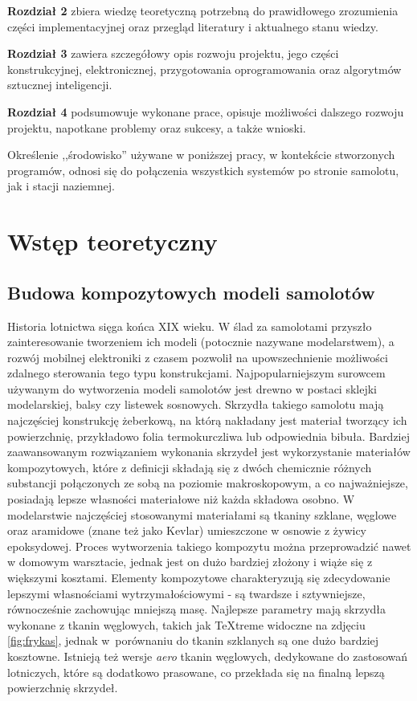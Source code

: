 \documentclass[12pt, a4paper]{article}
\begin{document}
\textbf{Rozdział 2} zbiera wiedzę teoretyczną potrzebną do prawidłowego zrozumienia części implementacyjnej oraz przegląd literatury i aktualnego stanu wiedzy.

\textbf{Rozdział 3} zawiera szczegółowy opis rozwoju projektu, jego części konstrukcyjnej, elektronicznej, przygotowania oprogramowania oraz algorytmów sztucznej inteligencji.

\textbf{Rozdział 4} podsumowuje wykonane prace, opisuje możliwości dalszego rozwoju projektu, napotkane problemy oraz sukcesy, a także wnioski.

Określenie ,,środowisko'' używane w poniższej pracy, w kontekście stworzonych programów, odnosi się do połączenia wszystkich systemów po stronie samolotu, jak i stacji naziemnej.

\clearpage
\section{Wstęp teoretyczny}

\subsection{Budowa kompozytowych modeli samolotów}
Historia lotnictwa sięga końca XIX wieku. W ślad za samolotami przyszło zainteresowanie tworzeniem ich modeli (potocznie nazywane modelarstwem), a rozwój mobilnej elektroniki z czasem pozwolił na upowszechnienie możliwości zdalnego sterowania tego typu konstrukcjami. Najpopularniejszym surowcem używanym do wytworzenia modeli samolotów jest drewno w postaci sklejki modelarskiej, balsy czy listewek sosnowych. Skrzydła takiego samolotu mają najczęściej konstrukcję żeberkową, na którą nakładany jest materiał tworzący ich powierzchnię, przykładowo folia termokurczliwa lub odpowiednia bibuła. Bardziej zaawansowanym rozwiązaniem wykonania skrzydeł jest wykorzystanie materiałów kompozytowych, które z definicji składają się z dwóch chemicznie różnych substancji połączonych ze sobą na poziomie makroskopowym, a co najważniejsze, posiadają lepsze własności materiałowe niż każda składowa osobno. W modelarstwie najczęściej stosowanymi materiałami są tkaniny szklane, węglowe oraz aramidowe (znane też jako Kevlar) umieszczone w osnowie z żywicy epoksydowej. Proces wytworzenia takiego kompozytu można przeprowadzić nawet w domowym warsztacie, jednak jest on dużo bardziej złożony i wiąże się z większymi kosztami. Elementy kompozytowe charakteryzują się zdecydowanie lepszymi własnościami wytrzymałościowymi - są twardsze i sztywniejsze, równocześnie zachowując mniejszą masę. Najlepsze parametry mają skrzydła wykonane z tkanin węglowych, takich jak TeXtreme widoczne na zdjęciu \ref{fig:frykas}, jednak w~porównaniu do tkanin szklanych są one dużo bardziej kosztowne. Istnieją też wersje \textit{aero} tkanin węglowych, dedykowane do zastosowań lotniczych, które są dodatkowo prasowane, co przekłada się na finalną lepszą powierzchnię skrzydeł.
\end{document}
